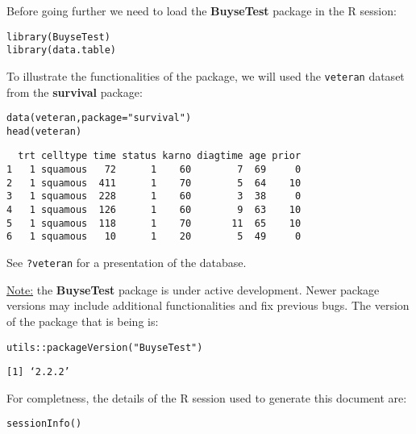 \documentclass[12pt]{article}
\begin{document}
\clearpage

Before going further we need to load the \textbf{BuyseTest} package in the R
session:
\lstset{language=r,label= ,caption= ,captionpos=b,numbers=none}
\begin{lstlisting}
library(BuyseTest)
library(data.table)
\end{lstlisting}

To illustrate the functionalities of the package, we will used the
\texttt{veteran} dataset from the \textbf{survival} package:
\lstset{language=r,label= ,caption= ,captionpos=b,numbers=none}
\begin{lstlisting}
data(veteran,package="survival")
head(veteran)
\end{lstlisting}

\begin{verbatim}
  trt celltype time status karno diagtime age prior
1   1 squamous   72      1    60        7  69     0
2   1 squamous  411      1    70        5  64    10
3   1 squamous  228      1    60        3  38     0
4   1 squamous  126      1    60        9  63    10
5   1 squamous  118      1    70       11  65    10
6   1 squamous   10      1    20        5  49     0
\end{verbatim}

See \texttt{?veteran} for a presentation of the database.

\bigskip

\uline{Note:} the \textbf{BuyseTest} package is under active development. Newer
package versions may include additional functionalities and fix
previous bugs. The version of the package that is being is:
\lstset{language=r,label= ,caption= ,captionpos=b,numbers=none}
\begin{lstlisting}
utils::packageVersion("BuyseTest")
\end{lstlisting}

\begin{verbatim}
[1] ‘2.2.2’
\end{verbatim}

For completness, the details of the R session used to generate this
document are:
\lstset{language=r,label= ,caption= ,captionpos=b,numbers=none}
\begin{lstlisting}
sessionInfo()
\end{lstlisting}
\end{document}
